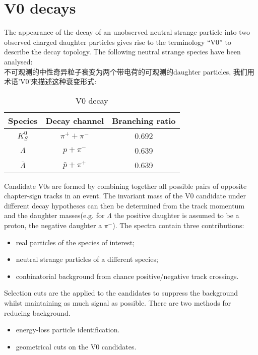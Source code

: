  \section{V0 decays}
 The appearance of the decay of an unobserved neutral strange particle into two observed charged daughter particles gives rise to the terminology \textquotedblleft{}V0\textquotedblright{} to describe the decay topology.
The following neutral strange species have been analysed:\\
{\color{red}不可观测的中性奇异粒子衰变为两个带电荷的可观测的daughter particles, 我们用术语'V0'来描述这种衰变形式:}
\begin{table}[hbpt]
  \centering
  \begin{tabular}{ccc} \hline\hline
    Species & Decay channel & Branching ratio \\\hline
    $K^{0}_{S}$  & $\pi^{+} + \pi^{-}$ & 0.692 \\\hline
    $\Lambda$ & $p + \pi^{-}$ & 0.639 \\\hline
    $\bar{\Lambda}$ & $\bar{p} + \pi^{+}$ & 0.639 \\\hline
  \end{tabular}
  \caption{V0 decay}
  \label{tab:V0decay}
\end{table}
Candidate V0s are formed by combining together all possible pairs of opposite chapter-sign tracks in an event.
The invariant mass of the V0 candidate under different decay hypotheses can then be determined from the track momentum and the daughter masses(e.g. for $\Lambda$ the positive daughter is assumed to be a proton, the negative daughter a $\pi^{-}$).
The spectra contain three contributions:
\begin{itemize}
\item {\color{red}real particles of the species of interest;}
\item {\color{red}neutral strange particles of a different species;}
\item {\color{red}conbinatorial background from chance positive/negative track crossings.}
\end{itemize}
Selection cuts are the applied to the candidates to suppress the background whilst maintaining as much signal as possible.
There are two methods for reducing background.
\begin{itemize}
\item {\color{seagreen}energy-loss particle identification.}
\item {\color{seagreen}geometrical cuts on the V0 candidates.}
\end{itemize}

